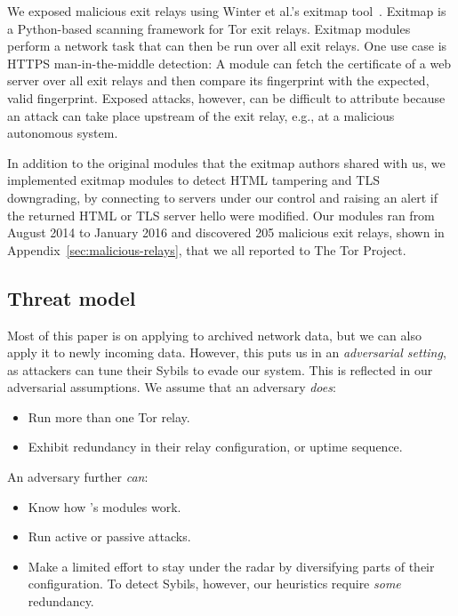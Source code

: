 We exposed malicious exit relays using Winter et al.'s exitmap tool~\cite[\S
3.1]{Winter2014a}.  Exitmap is a Python-based scanning framework for Tor exit
relays.  Exitmap modules perform a network task that can then be run over all
exit relays.  One use case is HTTPS man-in-the-middle detection: A module can
fetch the certificate of a web server over all exit relays and then compare its
fingerprint with the expected, valid fingerprint.  Exposed attacks, however, can
be difficult to attribute because an attack can take place upstream of the exit
relay, e.g., at a malicious autonomous system.

In addition to the original modules that the exitmap authors shared with us, we
implemented exitmap modules to detect HTML tampering and TLS downgrading, by
connecting to servers under our control and raising an alert if the returned
HTML or TLS server hello were modified.  Our modules ran from August 2014 to
January 2016 and discovered 205 malicious exit relays, shown in
Appendix~\ref{sec:malicious-relays}, that we all reported to The Tor Project.

\subsection{Threat model}
\label{sec:threat_model}
Most of this paper is on applying \sys to archived network data, but we can also
apply it to newly incoming data.  However, this puts us in an \emph{adversarial
setting}, as attackers can tune their Sybils to evade our system.  This is
reflected in our adversarial assumptions.  We assume that an adversary
\emph{does}:
\begin{itemize}
	\item Run more than one Tor relay.

	\item Exhibit redundancy in their relay configuration, or uptime sequence.
\end{itemize}

An adversary further \emph{can}:
\begin{itemize}
	\item Know how \sys's modules work.

	\item Run active or passive attacks.

	\item Make a limited effort to stay under the radar by diversifying parts of
		their configuration.  To detect Sybils, however, our heuristics require
		\emph{some} redundancy.
\end{itemize}

